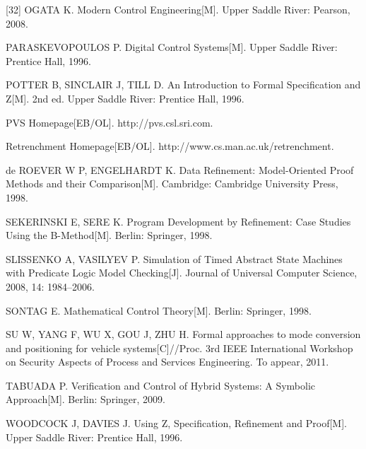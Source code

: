 {{[32] OGATA K. Modern Control Engineering[M]. Upper Saddle River: Pearson, 2008.\par
[33] PARASKEVOPOULOS P. Digital Control Systems[M]. Upper Saddle River: Prentice Hall, 1996.\par
[34] POTTER B, SINCLAIR J, TILL D. An Introduction to Formal Specification and Z[M]. 2nd ed. Upper Saddle River: Prentice Hall, 1996.\par
[35] PVS Homepage[EB/OL]. http://pvs.csl.sri.com.\par
[36] Retrenchment Homepage[EB/OL]. http://www.cs.man.ac.uk/retrenchment.\par
[37] de ROEVER W P, ENGELHARDT K. Data Refinement: Model-Oriented Proof Methods and their Comparison[M]. Cambridge: Cambridge University Press, 1998.\par
[38] SEKERINSKI E, SERE K. Program Development by Refinement: Case Studies Using the B-Method[M]. Berlin: Springer, 1998.\par
[39] SLISSENKO A, VASILYEV P. Simulation of Timed Abstract State Machines with Predicate Logic Model Checking[J]. Journal of Universal Computer Science, 2008, 14: 1984--2006.\par
[40] SONTAG E. Mathematical Control Theory[M]. Berlin: Springer, 1998.\par
[41] SU W, YANG F, WU X, GOU J, ZHU H. Formal approaches to mode conversion and positioning for vehicle systems[C]//Proc. 3rd IEEE International Workshop on Security Aspects of Process and Services Engineering. To appear, 2011.\par
[42] TABUADA P. Verification and Control of Hybrid Systems: A Symbolic Approach[M]. Berlin: Springer, 2009.\par
[43] WOODCOCK J, DAVIES J. Using Z, Specification, Refinement and Proof[M]. Upper Saddle River: Prentice Hall, 1996.\par}

\par}
\endgroup
